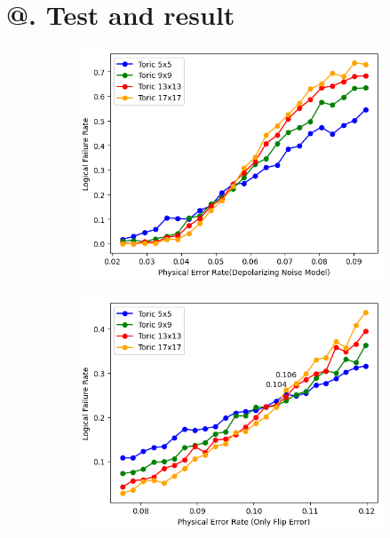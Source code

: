 \documentclass[
	a4paper, %
	10pt, %
	unnumberedsections, %
	twoside, %
]{LTJournalArticle}
\makeatletter
\newcommand{\Rmnum}[1]{\expandafter\@slowromancap\romannumeral #1@}
\makeatother
\begin{document}
\section{\Rmnum{5}. Test and result}
\begin{figure}[htbp] %
    \centering %
    \vspace{0cm} %
    \setlength{\abovecaptionskip}{0.cm} %
    \setlength{\belowcaptionskip}{0.cm} %
    \setlength{\belowdisplayskip}{3pt} %
	\begin{subfigure}[b]{0.9\linewidth}
        \includegraphics[width=\linewidth]{img/errorThres.png}
        \caption{}
        \label{fig:subfig1}
    \end{subfigure}
    \hfill
    \begin{subfigure}[b]{0.9\linewidth}
        \includegraphics[width=\linewidth]{img/errorThres2.png}
        \caption{}
        \label{fig:subfig2}
    \end{subfigure}
    \caption{}
    \end{figure}
\end{document}
